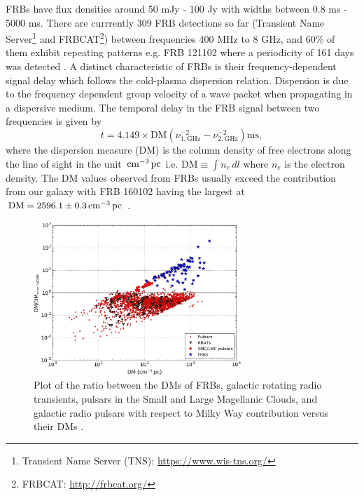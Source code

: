 FRBs have flux densities around 50 mJy - 100 Jy with widths between 0.8 ms - 5000 ms. There are currrently 309 FRB detections so far (Transient Name Server\footnote{Transient Name Server (TNS): \url{https://www.wis-tns.org/}} and FRBCAT\footnote{FRBCAT: \url{http://frbcat.org/}}) between frequencies 400 MHz to 8 GHz, and 60\% of them exhibit repeating patterns e.g. FRB 121102 where a periodicity of 161 days was detected \cite{Cruces2020}. A distinct characteristic of FRBs is their frequency-dependent signal delay which follows the cold-plasma dispersion relation. Dispersion is due to the frequency dependent group velocity of a wave packet when propagating in a dispersive medium. The temporal delay in the FRB signal between two frequencies is given by 
\begin{equation} \label{eq:dmdelay}
    t = 4.149 \times \text{DM} \left(\nu_{1,\text{GHz}}^{-2} - \nu_{2,\text{GHz}}^{-2}\right) \text{ms},
\end{equation}
where the dispersion measure (DM) is the column density of free electrons along the line of sight in the unit $\,\text{cm}^{-3}\,\text{pc}$ i.e. $\text{DM}\equiv\int n_e\,dl$ where $n_e$ is the electron density. The DM values observed from FRBs usually exceed the contribution from our galaxy with FRB 160102 having the largest at $\text{DM} = 2596.1 \pm 0.3 \,\text{cm}^{-3}\,\text{pc}$ \cite{Petroff_Hessels_Lorimer_2019}.

\begin{figure}
    \centering
    \includegraphics[width=0.7\textwidth]{Images/DM.jpg}
    \caption[DMs of FRBs, RRATs, Pulsars]{Plot of the ratio between the DMs of FRBs, galactic rotating radio transients, pulsars in the Small and Large Magellanic Clouds, and galactic radio pulsars with respect to Milky Way contribution versus their DMs \protect\cite{Petroff_Hessels_Lorimer_2019}.}
    \label{fig:dmdist}
\end{figure}

